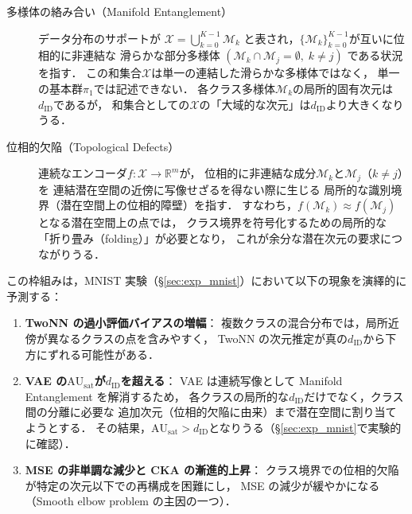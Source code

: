 \documentclass[12pt,a4paper]{jsarticle}
\newcommand{\dID}{d_{\mathrm{ID}}}
\newcommand{\dz}{m}                         %
\newcommand{\AUsat}{\mathrm{AU}_{\mathrm{sat}}}
\begin{document}
\begin{description}
  \item[多様体の絡み合い（Manifold Entanglement）\cite{carlsson2009topology}]
        データ分布のサポートが
        $\mathcal{X} = \bigcup_{k=0}^{K-1} \mathcal{M}_k$
        と表され，$\{\mathcal{M}_k\}_{k=0}^{K-1}$が互いに位相的に非連結な
        滑らかな部分多様体
        $(\mathcal{M}_k \cap \mathcal{M}_j = \emptyset,\; k \neq j)$
        である状況を指す．
        この和集合$\mathcal{X}$は単一の連結した滑らかな多様体ではなく，
        単一の基本群$\pi_1$では記述できない．
        各クラス多様体$\mathcal{M}_k$の局所的固有次元は$\dID$であるが，
        和集合としての$\mathcal{X}$の「大域的な次元」は$\dID$より大きくなりうる．
  \item[位相的欠陥（Topological Defects）]
        連続なエンコーダ$f: \mathcal{X} \to \mathbb{R}^{\dz}$が，
        位相的に非連結な成分$\mathcal{M}_k$と$\mathcal{M}_j$（$k \neq j$）を
        連結潜在空間の近傍に写像せざるを得ない際に生じる
        局所的な識別境界（潜在空間上の位相的障壁）を指す．
        すなわち，$f(\mathcal{M}_k) \approx f(\mathcal{M}_j)$となる潜在空間上の点では，
        クラス境界を符号化するための局所的な「折り畳み（folding）」が必要となり，
        これが余分な潜在次元の要求につながりうる．
\end{description}

この枠組みは，MNIST 実験（§\ref{sec:exp_mnist}）において以下の現象を演繹的に予測する：

\begin{enumerate}
  \item \textbf{TwoNN の過小評価バイアスの増幅}：
        複数クラスの混合分布では，局所近傍が異なるクラスの点を含みやすく，
        TwoNN の次元推定が真の$\dID$から下方にずれる可能性がある．

  \item \textbf{VAE の$\AUsat$が$\dID$を超える}：
        VAE は連続写像として Manifold Entanglement を解消するため，
        各クラスの局所的な$\dID$だけでなく，クラス間の分離に必要な
        追加次元（位相的欠陥に由来）まで潜在空間に割り当てようとする．
        その結果，$\AUsat > \dID$となりうる（§\ref{sec:exp_mnist}で実験的に確認）．

  \item \textbf{MSE の非単調な減少と CKA の漸進的上昇}：
        クラス境界での位相的欠陥が特定の次元以下での再構成を困難にし，
        MSE の減少が緩やかになる（Smooth elbow problem の主因の一つ）．
\end{enumerate}
\end{document}
